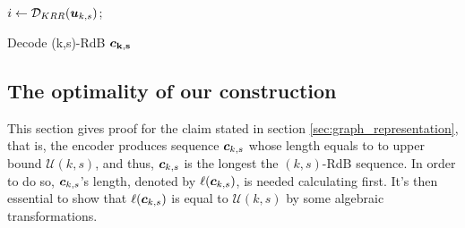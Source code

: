 \begin{algorithm}
\DontPrintSemicolon
    \BlankLine
    
    $i \gets {\cal D}_{KRR}({\boldsymbol u}_{k,s})$; \\
    \caption{Decode (k,s)-RdB $\bf{\boldsymbol c}_{k,s}$}
    \label{alg:decode}
\end{algorithm}

\subsection{The optimality of our construction}
This section gives proof for the claim stated in section \ref{sec:graph_representation}, that is, the encoder produces sequence ${\boldsymbol c}_{k,s}$ whose length equals to to upper bound $\mathcal{U}(k,s)$, and thus, ${\boldsymbol c}_{k,s}$ is the longest the $(k,s)$-RdB sequence. In order to do so, ${\boldsymbol c}_{k,s}$'s length, denoted by $\ell({\boldsymbol c}_{k,s})$, is needed calculating first. It's then essential to show that $\ell({\boldsymbol c}_{k,s})$ is equal to $\mathcal{U}(k,s)$ by some algebraic transformations.

